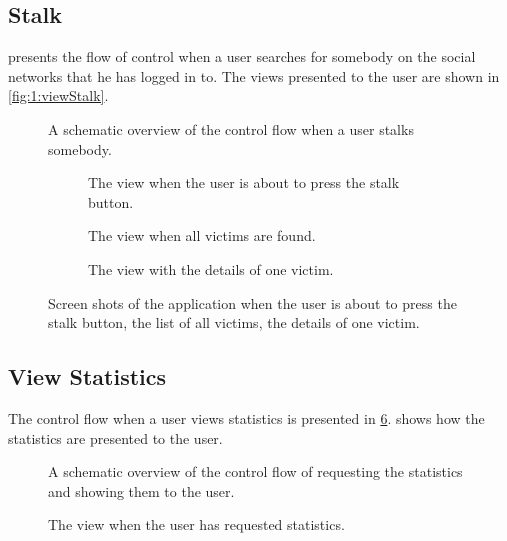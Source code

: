 	\subsection{Stalk}
		 presents the flow of control when a user searches for somebody on the social networks that he has logged in to. The views presented to the user are shown in \autoref{fig:1:viewStalk}.


			\begin{figure}
				\caption{A schematic overview of the control flow when a user stalks somebody.}
				\label{fig:1:controlflowStalk}
			\end{figure}	

			\begin{figure}
				\begin{subfigure}{\textwidth}
					\caption{The view when the user is about to press the stalk button.}
					\label{fig:1:viewStalk:startStalk}
				\end{subfigure}
				\begin{subfigure}{\textwidth}
					\caption{The view when all victims are found.}
					\label{fig:1:viewStalk:allVictims}
				\end{subfigure}		
				\begin{subfigure}{\textwidth}
					\caption{The view with the details of one victim.}
					\label{fig:1:viewStalk:oneVictim}
				\end{subfigure}						
				
				\caption{Screen shots of the application when  the user is about to press the stalk button,  the list of all victims,  the details of one victim.}
				\label{fig:1:viewStalk}
			\end{figure}

	\subsection{View Statistics}
		The control flow when a user views statistics is presented in \cref{fig:1:controlflowStat}.  shows how the statistics are presented to the user.


		\begin{figure}
			\caption{A schematic overview of the control flow of requesting the statistics and showing them to the user.}
			\label{fig:1:controlflowStat}
		\end{figure}

		\begin{figure}
			\caption{The view when the user has requested statistics.}
			\label{fig:1:viewStat}
		\end{figure}